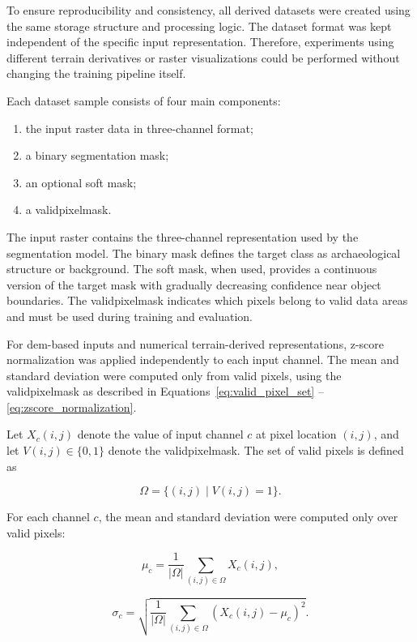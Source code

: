 To ensure reproducibility and consistency, all derived datasets were created using the same storage structure and processing logic. The dataset format was kept independent of the specific input representation. Therefore, experiments using different terrain derivatives or raster visualizations could be performed without changing the training pipeline itself.

Each dataset sample consists of four main components:
\begin{enumerate}
    \item the input raster data in three-channel format;
    \item a binary segmentation mask;
    \item an optional soft mask;
    \item a \gls{validpixelmask}.
\end{enumerate}

The input raster contains the three-channel representation used by the segmentation model. The binary mask defines the target class as archaeological structure or background. The soft mask, when used, provides a continuous version of the target mask with gradually decreasing confidence near object boundaries. The \gls{validpixelmask} indicates which pixels belong to valid data areas and must be used during training and evaluation.

For \gls{dem}-based inputs and numerical terrain-derived representations, z-score normalization was applied independently to each input channel. The mean and standard deviation were computed only from valid pixels, using the \gls{validpixelmask} as described in Equations~\eqref{eq:valid_pixel_set} -- \eqref{eq:zscore_normalization}.

Let \(X_c(i,j)\) denote the value of input channel \(c\) at pixel location \((i,j)\), and let \(V(i,j) \in \{0,1\}\) denote the \gls{validpixelmask}. The set of valid pixels is defined as

\begin{equation}
\Omega = \{(i,j) \mid V(i,j)=1\}.
\label{eq:valid_pixel_set}
\end{equation}

For each channel \(c\), the mean and standard deviation were computed only over valid pixels:

\begin{equation}
\mu_c = \frac{1}{|\Omega|} \sum_{(i,j)\in\Omega} X_c(i,j),
\label{eq:zscore_mean}
\end{equation}

\begin{equation}
\sigma_c =
\sqrt{
\frac{1}{|\Omega|}
\sum_{(i,j)\in\Omega}
\left(X_c(i,j)-\mu_c\right)^2
}.
\label{eq:zscore_std}
\end{equation}

